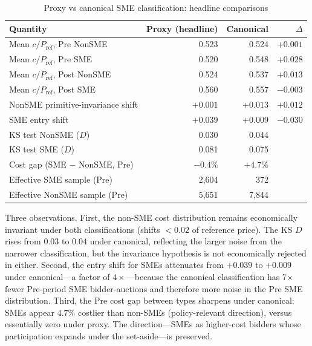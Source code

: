 \documentclass[12pt]{article}
\begin{document}
\begin{table}[htbp]
\centering
\caption{Proxy vs canonical SME classification: headline comparisons}
\label{tab:canonical-compare}
\small
\begin{tabular}{lrrr}
\toprule
Quantity & Proxy (headline) & Canonical & $\Delta$ \\
\midrule
Mean $c/P_{\text{ref}}$, Pre NonSME   & 0.523 & 0.524 & $+0.001$ \\
Mean $c/P_{\text{ref}}$, Pre SME      & 0.520 & 0.548 & $+0.028$ \\
Mean $c/P_{\text{ref}}$, Post NonSME  & 0.524 & 0.537 & $+0.013$ \\
Mean $c/P_{\text{ref}}$, Post SME     & 0.560 & 0.557 & $-0.003$ \\
\midrule
NonSME primitive-invariance shift     & $+0.001$ & $+0.013$ & $+0.012$ \\
SME entry shift                        & $+0.039$ & $+0.009$ & $-0.030$ \\
KS test NonSME ($D$)                  & 0.030 & 0.044 & \\
KS test SME ($D$)                     & 0.081 & 0.075 & \\
\midrule
Cost gap (SME $-$ NonSME, Pre)         & $-0.4\%$ & $+4.7\%$ & \\
Effective SME sample (Pre)             & 2{,}604 & 372 & \\
Effective NonSME sample (Pre)          & 5{,}651 & 7{,}844 & \\
\bottomrule
\end{tabular}
\end{table}

Three observations. First, the non-SME cost distribution remains
economically invariant under both classifications (shifts $<0.02$ of
reference price). The KS $D$ rises from $0.03$ to $0.04$ under canonical,
reflecting the larger noise from the narrower classification, but the
invariance hypothesis is not economically rejected in either. Second,
the entry shift for SMEs attenuates from $+0.039$ to $+0.009$ under
canonical---a factor of $4\times$---because the canonical classification
has 7$\times$ fewer Pre-period SME bidder-auctions and therefore more
noise in the Pre SME distribution. Third, the Pre cost gap between
types sharpens under canonical: SMEs appear $4.7\%$ costlier than
non-SMEs (policy-relevant direction), versus essentially zero under
proxy. The direction---SMEs as higher-cost bidders whose participation
expands under the set-aside---is preserved.
\end{document}
